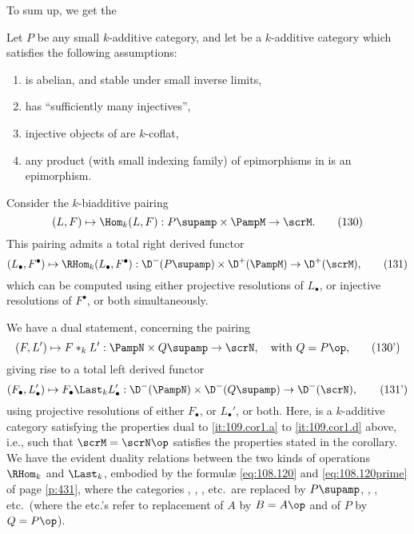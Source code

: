 To sum up, we get the
\begin{corollarynum}\label{cor:109.prop4.1}
  Let $P$ be any small $k$-additive category, and let \scrM{} be a
  $k$-additive category which satisfies the following assumptions:
  \begin{enumerate}[label=\alph*),font=\normalfont]
  \item\label{it:109.cor1.a}
    \scrM{} is abelian, and stable under small inverse limits,
  \item\label{it:109.cor1.b}
    \scrM{} has ``sufficiently many injectives'',
  \item\label{it:109.cor1.c}
    injective objects of \scrM{} are $k$-coflat,
  \item\label{it:109.cor1.d}
    any product \textup(with small indexing family\textup) of
    epimorphisms in \scrM{} is an epimorphism.
  \end{enumerate}
  Consider the $k$-biadditive pairing
  \begin{equation}
    \label{eq:109.130}
    (L,F)\mapsto\Hom_k(L,F) : P\supamp \times\PampM\to\scrM.\tag{130}
  \end{equation}
  This pairing admits a total right derived functor
  \begin{equation}
    \label{eq:109.131}
    (L_\bullet,F^\bullet)\mapsto\RHom_k(L_\bullet,F^\bullet) :
    \D^-(P\supamp) \times \D^+(\PampM) \to \D^+(\scrM),\tag{131}
  \end{equation}
  which can be computed using either projective resolutions of
  $L_\bullet$, or injective resolutions of $F^\bullet$, or both
  simultaneously.
\end{corollarynum}

We have a dual statement, concerning the pairing
\begin{equation}
  \label{eq:109.130prime}
  (F,L')\mapsto F*_kL': \PampN\times Q\supamp \to\scrN,
  \quad\text{with $Q=P\op$,}\tag{130'}
\end{equation}
giving rise to a total left derived functor
\begin{equation}
  \label{eq:109.131prime}
  (F_\bullet,L_\bullet') \mapsto F_\bullet\Last_k L_\bullet' :
  \D^-(\PampN) \times \D^-(Q\supamp) \to \D^-(\scrN),\tag{131'}
\end{equation}
using projective resolutions of either $F_\bullet$, or $L_\bullet'$,
or both. Here, \scrN{} is a $k$-additive category satisfying the
properties dual to \ref{it:109.cor1.a} to \ref{it:109.cor1.d} above,
i.e., such that $\scrM=\scrN\op$ satisfies the properties stated in
the corollary. We have the evident duality relations between the two
kinds of operations $\RHom_k$ and $\Last_k$, embodied by the formulæ
\eqref{eq:108.120} and \eqref{eq:108.120prime} of page \ref{p:431},
where the categories \Ahatk, \AhatM, \AhatN, etc.\ are replaced by
$P\supamp$, \PampM, \PampN, etc.\ (where the etc.'s refer to
replacement of $A$ by $B=A\op$ and of $P$ by $Q=P\op$).

